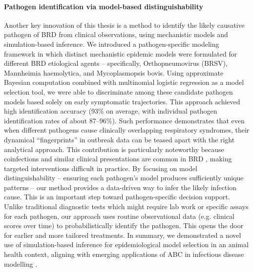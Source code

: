 \paragraph{Pathogen identification via model-based distinguishability} Another key innovation of this thesis is a method to identify the likely causative pathogen of BRD from clinical observations, using mechanistic models and simulation-based inference. We introduced a pathogen-specific modeling framework in which distinct mechanistic epidemic models were formulated for different BRD etiological agents – specifically, Orthopneumovirus (BRSV), Mannheimia haemolytica, and Mycoplasmopsis bovis. Using approximate Bayesian computation combined with multinomial logistic regression as a model selection tool, we were able to discriminate among these candidate pathogen models based solely on early symptomatic trajectories. This approach achieved high identification accuracy (93\% on average, with individual pathogen identification rates of about 87–96\%). Such performance demonstrates that even when different pathogens cause clinically overlapping respiratory syndromes, their dynamical “fingerprints” in outbreak data can be teased apart with the right analytical approach. This contribution is particularly noteworthy because coinfections and similar clinical presentations are common in BRD \cite{Gaudino2022}, making targeted interventions difficult in practice. By focusing on model distinguishability – ensuring each pathogen’s model produces sufficiently unique patterns – our method provides a data-driven way to infer the likely infection cause. This is an important step toward pathogen-specific decision support. Unlike traditional diagnostic tests which might require lab work or specific assays for each pathogen, our approach uses routine observational data (e.g. clinical scores over time) to probabilistically identify the pathogen. This opens the door for earlier and more tailored treatments. In summary, we demonstrated a novel use of simulation-based inference for epidemiological model selection in an animal health context, aligning with emerging applications of ABC in infectious disease modelling \cite{beaumont2019abc}.

